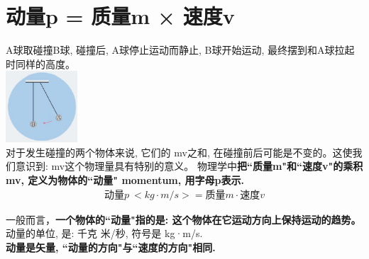 \documentclass[UTF8]{ctexart}
\begin{document}
	
	
	
		
		
\section{动量p = 质量m × 速度v}

A球取碰撞B球, 碰撞后, A球停止运动而静止, B球开始运动, 最终摆到和A球拉起时同样的高度。 \\
\includegraphics[width=0.2\textwidth]{img/0103.png} \\

对于发生碰撞的两个物体来说, 它们的 mv之和, 在碰撞前后可能是不变的。这使我们意识到: mv这个物理量具有特别的意义。
物理学中\textbf{把``质量m"和``速度v"的乘积mv, 定义为物体的``动量" momentum, 用字母p表示.} 
\begin{align*}
	\boxed{
\text{动量}p\ <kg·m/s>=\text{质量}m\cdot \text{速度}v
	}
\end{align*}

一般而言，\textbf{一个物体的``动量"指的是: 这个物体在它运动方向上保持运动的趋势。}\\

动量的单位, 是: 千克 米/秒, 符号是 kg·m/s. \\
\textbf{动量是矢量, ``动量的方向"与``速度的方向"相同.}\\
\end{document}
